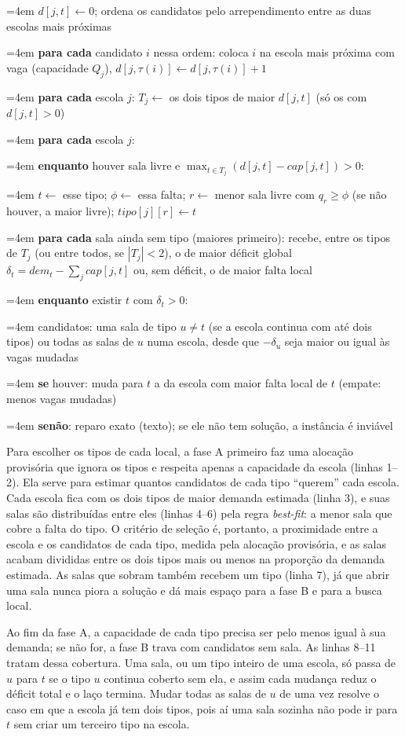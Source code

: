 \documentclass[12pt]{article}
\newcommand{\linha}[1]{\par\noindent\hangindent=4em\hangafter=1\makebox[1.4em][r]{\scriptsize #1}\hspace{0.6em}}
\begin{document}
\begin{algoritmo}[htbp]
  \caption{Fase A: tipos das escolas e das salas.}\label{alg:faseA}
  \small
  \linha{1} $d[j,t] \gets 0$; ordena os candidatos pelo arrependimento entre as duas escolas mais próximas
  \linha{2} \textbf{para cada} candidato $i$ nessa ordem: coloca $i$ na escola mais
    próxima com vaga (capacidade $Q_j$), $d[j,\tau(i)] \gets d[j,\tau(i)] + 1$
  \linha{3} \textbf{para cada} escola $j$: $T_j \gets$ os dois tipos de maior $d[j,t]$ (só os com $d[j,t] > 0$)
  \linha{4} \textbf{para cada} escola $j$:
  \linha{5} \quad \textbf{enquanto} houver sala livre e $\max_{t \in T_j} (d[j,t] - \mathit{cap}[j,t]) > 0$:
  \linha{6} \quad\quad $t \gets$ esse tipo; $\phi \gets$ essa falta; $r \gets$ menor sala livre com
    $q_r \ge \phi$ (se não houver, a maior livre); $\mathit{tipo}[j][r] \gets t$
  \linha{7} \textbf{para cada} sala ainda sem tipo (maiores primeiro): recebe, entre os tipos de
    $T_j$ (ou entre todos, se $|T_j| < 2$), o de maior déficit global
    $\delta_t = \mathit{dem}_t - \sum_j \mathit{cap}[j,t]$ ou, sem déficit, o de maior falta local
  \linha{8} \textbf{enquanto} existir $t$ com $\delta_t > 0$:
  \linha{9} \quad candidatos: uma sala de tipo $u \ne t$ (se a escola continua com até dois tipos) ou
    todas as salas de $u$ numa escola, desde que $-\delta_u$ seja maior ou igual às vagas mudadas
  \linha{10} \quad \textbf{se} houver: muda para $t$ a da escola com maior falta local de $t$
    (empate: menos vagas mudadas)
  \linha{11} \quad \textbf{senão}: reparo exato (texto); se ele não tem solução, a instância é inviável
\end{algoritmo}

Para escolher os tipos de cada local, a fase A primeiro faz uma alocação provisória que ignora os
tipos e respeita apenas a capacidade da escola (linhas 1--2). Ela serve para estimar quantos
candidatos de cada tipo ``querem'' cada escola. Cada escola fica com os dois tipos de maior demanda
estimada (linha 3), e suas salas são distribuídas entre eles (linhas 4--6) pela regra
\emph{best-fit}: a menor sala que cobre a falta do tipo. O critério de seleção é, portanto, a
proximidade entre a escola e os candidatos de cada tipo, medida pela alocação provisória, e as
salas acabam divididas entre os dois tipos mais ou menos na proporção da demanda estimada. As salas
que sobram também recebem um tipo (linha 7), já que abrir uma sala nunca piora a solução e dá mais
espaço para a fase B e para a busca local.

Ao fim da fase A, a capacidade de cada tipo precisa ser pelo menos igual à sua demanda; se não for,
a fase B trava com candidatos sem sala. As linhas 8--11 tratam dessa cobertura. Uma sala, ou um
tipo inteiro de uma escola, só passa de $u$ para $t$ se o tipo $u$ continua coberto sem ela, e
assim cada mudança reduz o déficit total e o laço termina. Mudar todas as salas de $u$ de uma vez
resolve o caso em que a escola já tem dois tipos, pois aí uma sala sozinha não pode ir para $t$
sem criar um terceiro tipo na escola.
\end{document}
